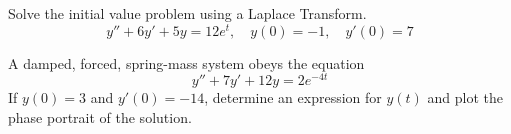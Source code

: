 \documentclass[12pt]{exam}
\begin{document}

\begin{questions}


    \question[10] Solve the initial value problem using a Laplace Transform. $$y'' + 6y' + 5y = 12 e^t, \quad y(0) = -1, \quad y'(0) = 7$$
    
    \newpage
    
    \question[10] A damped, forced, spring-mass system obeys the equation $$y'' + 7y' + 12y = 2 e^{-4t}$$
    If $y(0)=3$ and $y'(0)=-14$, determine an expression for $y(t)$ and plot the phase portrait of the solution. 
    
    
\end{questions}
\end{document}
